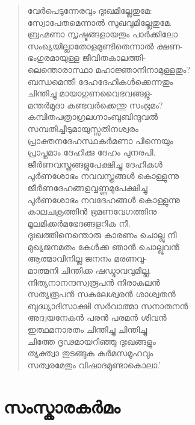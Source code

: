 \begin{verse}
വേര്‍പെടുന്നേരവും ദുഃഖമില്ലേതുമേ:\\
സ്വോപേതമെന്നാല്‍ സുഖവുമില്ലേതുമേ.\\
ബ്രഹ്മണാ സൃഷ്ടങ്ങളായതും പാര്‍ക്കിലോ\\
സംഖ്യയില്ലാതോളമുണ്ടിതെന്നാല്‍ ക്ഷണ-\\
ഭംഗുരമായുള്ള ജീവിതകാലത്തി-\\
ലെന്തൊരാസ്ഥാ മഹാജ്ഞാനിനാമുള്ളതും?\\
ബന്ധമെന്തീ ദേഹദേഹികള്‍ക്കെന്നതും\\
ചിന്തിച്ചു മായാഗുണവൈഭവങ്ങളു-\\
മന്തര്‍മുദാ കണ്ടവര്‍ക്കെന്തു സംഭ്രമം?\\
കമ്പിതപത്രാഗ്രലഗ്നാംബുബിന്ദുവല്‍\\
സമ്പതിച്ചീടുമായുസ്സതിനശ്വരം\\
പ്രാക്തനദേഹസ്ഥകര്‍മണാ പിന്നെയും\\
പ്രാപ്തമാം ദേഹിക്കു ദേഹം പുനരപി.\\
ജീര്‍ണവസ്ത്രങ്ങളുപേക്ഷിച്ചു ദേഹികള്‍\\
പൂര്‍ണശോഭം നവവസ്ത്രങ്ങള്‍ കൊള്ളുന്നു\\
ജീര്‍ണദേഹങ്ങളവ്വണ്ണമുപേക്ഷിച്ചു\\
പൂര്‍ണശോഭം നവദേഹങ്ങള്‍ കൊള്ളുന്നു\\
കാലചക്രത്തിന്‍ ഭ്രമണവേഗത്തിനു\\
മൂലമിക്കര്‍മഭേദങ്ങളറിക നീ.\\
ദുഃഖത്തിനെന്തൊരു കാരണം ചൊല്ലു നീ\\
മുഖ്യജനമതം കേള്‍ക്ക ഞാന്‍ ചൊല്ലുവന്‍\\
ആത്മാവിനില്ല ജനനം മരണവു-\\
മാത്മനി ചിന്തിക്ക ഷഡ്ഭാവവുമില്ല.\\
നിത്യനാനന്ദസ്വരൂപന്‍ നിരാകുലന്‍\\
സത്യരൂപന്‍ സകലേശ്വരന്‍ ശാശ്വതന്‍\\
ബുദ്ധ്യാദിസാക്ഷി സര്‍വാത്മാ സനാതനന്‍\\
അദ്വയനേകന്‍ പരന്‍ പരമന്‍ ശിവന്‍\\
ഇത്ഥമനാരതം ചിന്തിച്ചു ചിന്തിച്ചു\\
ചിത്തേ ദൃഢമായറിഞ്ഞു ദുഃഖങ്ങളും\\
ത്യക്ത്വാ തുടങ്ങുക കര്‍മസമൂഹവും\\
സത്വരമേതും വിഷാദമുണ്ടാകൊലാ.’
\end{verse}


\section{സംസ്കാരകര്‍മം}

